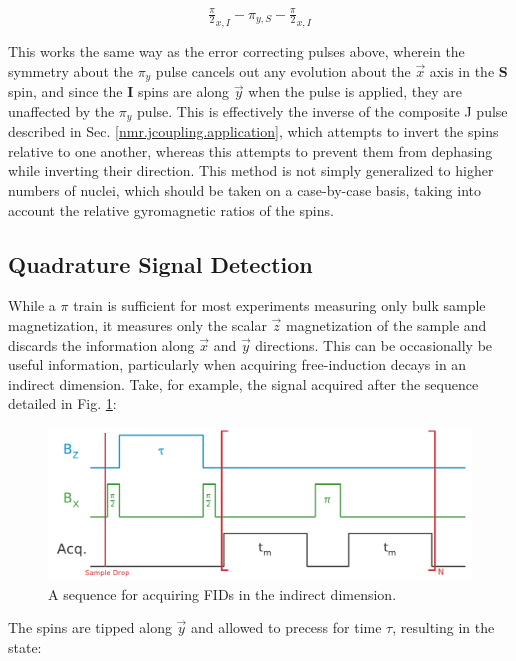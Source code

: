 \documentclass[PaulGanssle-Thesis.tex]{subfiles}
\begin{document}
\begin{equation}
\label{eqn:HeteronuclearMagnetizationDetectionPulse}
\tfrac{\pi}{2}_{x, I} - \pi_{y,S} - \tfrac{\pi}{2}_{x,I}
\end{equation}

This works the same way as the error correcting pulses above, wherein the symmetry about the $\pi_{y}$ pulse cancels out any evolution about the $\vec{x}$ axis in the $\mathbf{S}$ spin, and since the $\mathbf{I}$ spins are along $\vec{y}$ when the pulse is applied, they are unaffected by the $\pi_{y}$ pulse. This is effectively the inverse of the composite J pulse described in Sec. \ref{nmr.jcoupling.application}, which attempts to invert the spins relative to one another, whereas this attempts to prevent them from dephasing while inverting their direction. This method is not simply generalized to higher numbers of nuclei, which should be taken on a case-by-case basis, taking into account the relative gyromagnetic ratios of the spins.

\subsection{Quadrature Signal Detection}
\label{nmr.signal.magnetization.quadrature}
While a $\pi$ train is sufficient for most experiments measuring only bulk sample magnetization, it measures only the scalar $\vec{z}$ magnetization of the sample and discards the information along $\vec{x}$ and $\vec{y}$ directions. This can be occasionally be useful information, particularly when acquiring free-induction decays in an indirect dimension. Take, for example, the signal acquired after the sequence detailed in Fig. \ref{fig:IndirectFIDSequence}:
\begin{figure}[ht!]
\includegraphics[width=\tw]{figures/relaxometry/fid_acq_sequence_diagram.pdf}
\caption{A sequence for acquiring FIDs in the indirect dimension.}
\label{fig:IndirectFIDSequence}
\end{figure}
The spins are tipped along $\vec{y}$ and allowed to precess for time $\tau$, resulting in the state:
\end{document}

